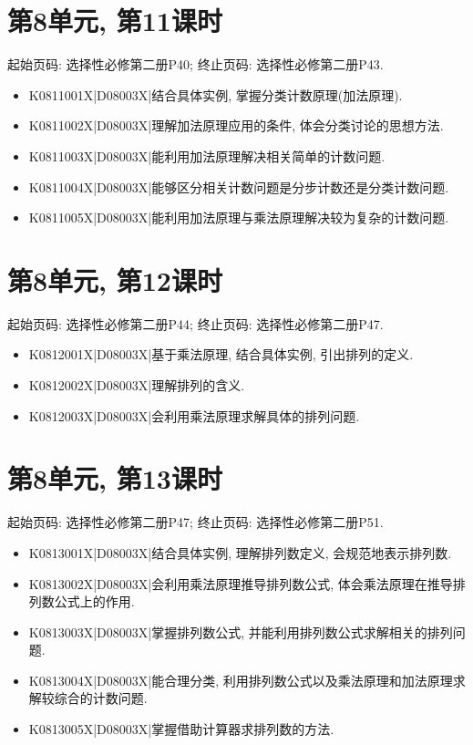 \section*{第8单元, 第11课时}
起始页码: 选择性必修第二册P40; 终止页码: 选择性必修第二册P43.
\begin{itemize}
\item K0811001X|D08003X|结合具体实例, 掌握分类计数原理(加法原理).
\item K0811002X|D08003X|理解加法原理应用的条件, 体会分类讨论的思想方法.
\item K0811003X|D08003X|能利用加法原理解决相关简单的计数问题.
\item K0811004X|D08003X|能够区分相关计数问题是分步计数还是分类计数问题.
\item K0811005X|D08003X|能利用加法原理与乘法原理解决较为复杂的计数问题.
\end{itemize}

\section*{第8单元, 第12课时}
起始页码: 选择性必修第二册P44; 终止页码: 选择性必修第二册P47.
\begin{itemize}
\item K0812001X|D08003X|基于乘法原理, 结合具体实例, 引出排列的定义.
\item K0812002X|D08003X|理解排列的含义.
\item K0812003X|D08003X|会利用乘法原理求解具体的排列问题.
\end{itemize}

\section*{第8单元, 第13课时}
起始页码: 选择性必修第二册P47; 终止页码: 选择性必修第二册P51.
\begin{itemize}
\item K0813001X|D08003X|结合具体实例, 理解排列数定义, 会规范地表示排列数.
\item K0813002X|D08003X|会利用乘法原理推导排列数公式, 体会乘法原理在推导排列数公式上的作用.
\item K0813003X|D08003X|掌握排列数公式, 并能利用排列数公式求解相关的排列问题.
\item K0813004X|D08003X|能合理分类, 利用排列数公式以及乘法原理和加法原理求解较综合的计数问题.
\item K0813005X|D08003X|掌握借助计算器求排列数的方法.
\end{itemize}

